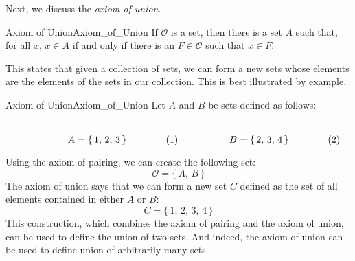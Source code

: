         Next, we discuss the \textit{axiom of union}.
        \begin{faxiom}{Axiom of Union}{Axiom_of_Union}
            If $\mathcal{O}$ is a set, then there is a set $A$ such that, for
            all $x$, $x\in{A}$ if and only if there is an $F\in\mathcal{O}$
            such that $x\in{F}$.
        \end{faxiom}
        This states that given a collection of sets, we can form a new sets
        whose elements are the elements of the sets in our collection. This
        is best illustrated by example.
        \begin{lexample}{Axiom of Union}{Axiom_of_Union}
            Let $A$ and $B$ be sets defined as follows:
            \par
            \begin{subequations}
                \begin{minipage}[b]{0.49\textwidth}
                    \centering
                    \begin{equation}
                        A=\{\,1,\,2,\,3\,\}
                    \end{equation}
                \end{minipage}
                \hfill
                \begin{minipage}[b]{0.49\textwidth}
                    \centering
                    \begin{equation}
                        B=\{\,2,\,3,\,4\,\}
                    \end{equation}
                \end{minipage}
            \end{subequations}
            \par
            \vspace{2.5ex}
            Using the axiom of pairing, we can create the following set:
            \begin{equation}
                \mathcal{O}=\{\,A,\,B\,\}
            \end{equation}
            The axiom of union says that we can form a new set $C$ defined as
            the set of all elements contained in either $A$ or $B$:
            \begin{equation}
                C=\{\,1,\,2,\,3,\,4\,\}
            \end{equation}
            This construction, which combines the axiom of pairing and the
            axiom of union, can be used to define the union of two sets. And
            indeed, the axiom of union can be used to define union of
            arbitrarily many sets.
        \end{lexample}
